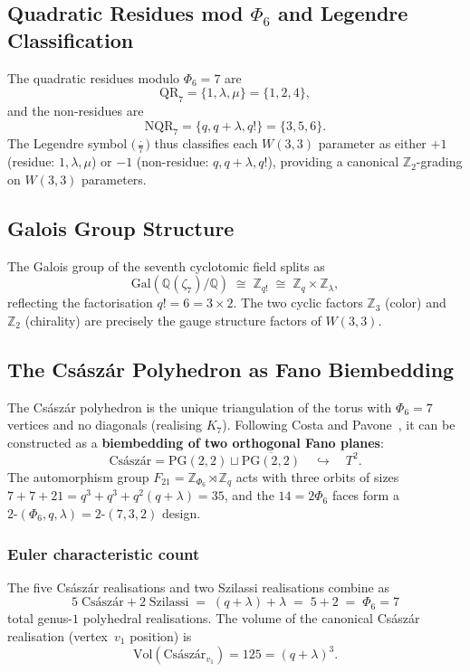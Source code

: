 \subsection{Quadratic Residues mod $\Phi_6$ and Legendre Classification}

The quadratic residues modulo $\Phi_6 = 7$ are
\[
  \mathrm{QR}_7 = \{1, \lambda, \mu\} = \{1, 2, 4\},
\]
and the non-residues are
\[
  \mathrm{NQR}_7 = \{q, q+\lambda, q!\} = \{3, 5, 6\}.
\]
The Legendre symbol $\bigl(\frac{\cdot}{7}\bigr)$ thus classifies each $W(3,3)$ parameter
as either $+1$ (residue: $1, \lambda, \mu$) or $-1$ (non-residue: $q, q+\lambda, q!$),
providing a canonical $\mathbb{Z}_2$-grading on $W(3,3)$ parameters.

\subsection{Galois Group Structure}

The Galois group of the seventh cyclotomic field splits as
\[
  \mathrm{Gal}(\mathbb{Q}(\zeta_7)/\mathbb{Q}) \;\cong\; \mathbb{Z}_{q!} \;\cong\; \mathbb{Z}_q \times \mathbb{Z}_\lambda,
\]
reflecting the factorisation $q! = 6 = 3 \times 2$.  The two cyclic factors
$\mathbb{Z}_3$ (color) and $\mathbb{Z}_2$ (chirality) are precisely the gauge
structure factors of $W(3,3)$.

\subsection{The Cs\'asz\'ar Polyhedron as Fano Biembedding}

The Cs\'asz\'ar polyhedron is the unique triangulation of the torus with
$\Phi_6 = 7$ vertices and no diagonals (realising $K_7$).  Following
Costa and Pavone~\cite{CosPav2024}, it can be constructed as a
\textbf{biembedding of two orthogonal Fano planes}:
\[
  \text{Cs\'asz\'ar} = \mathrm{PG}(2,2) \sqcup \overline{\mathrm{PG}(2,2)}
  \quad\hookrightarrow\quad T^2.
\]
The automorphism group $F_{21} = \mathbb{Z}_{\Phi_6} \rtimes \mathbb{Z}_q$ acts with three orbits
of sizes $7 + 7 + 21 = q^3 + q^3 + q^2(q+\lambda) = 35$, and the $14 = 2\Phi_6$ faces form a
$2\text{-}(\Phi_6, q, \lambda) = 2\text{-}(7, 3, 2)$ design.

\subsubsection*{Euler characteristic count}

The five Cs\'asz\'ar realisations and two Szilassi realisations combine as
\[
  5 \;\text{Cs\'asz\'ar} + 2 \;\text{Szilassi}
  \;=\; (q+\lambda) + \lambda \;=\; 5 + 2 \;=\; \Phi_6 = 7
\]
total genus-$1$ polyhedral realisations.  The volume of the canonical Cs\'asz\'ar
realisation (vertex~$v_1$ position) is
\[
  \mathrm{Vol}(\text{Cs\'asz\'ar}_{v_1}) = 125 = (q+\lambda)^3.
\]

